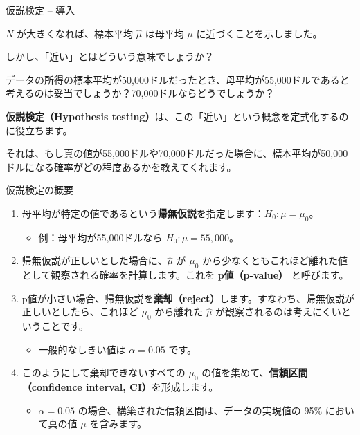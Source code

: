 \documentclass[11pt,handout]{beamer}
\newenvironment{wideitemize}{\itemize\addtolength{\itemsep}{10pt}}{\enditemize}
\begin{document}
\begin{frame}{仮説検定 -- 導入}
\begin{wideitemize}

\item
$N$ が大きくなれば、標本平均 $\hat\mu$ は母平均 $\mu$ に近づくことを示しました。

\item
しかし、「近い」とはどういう意味でしょうか？

\item
データの所得の標本平均が50,000ドルだったとき、母平均が55,000ドルであると考えるのは妥当でしょうか？70,000ドルならどうでしょうか？

\pause
\item
\textbf{仮説検定（Hypothesis testing）}は、この「近い」という概念を定式化するのに役立ちます。

\pause
\item
それは、もし真の値が55,000ドルや70,000ドルだった場合に、標本平均が50,000ドルになる確率がどの程度あるかを教えてくれます。

\end{wideitemize}
\end{frame}

\begin{frame}{仮説検定の概要}

\begin{enumerate}
	\item 
	母平均が特定の値であるという\textbf{帰無仮説}を指定します：$H_0: \mu = \mu_0$。
\smallskip
		\begin{itemize}
			\item 
			例：母平均が55,000ドルなら $H_0: \mu = 55,000$。
			\end{itemize}
	
	\medskip
	\pause
	\item
	帰無仮説が正しいとした場合に、$\hat\mu$ が $\mu_0$ から少なくともこれほど離れた値として観察される確率を計算します。これを \textbf{p値（p-value）} と呼びます。
	\medskip
	\pause
	\item
	p値が小さい場合、帰無仮説を\textbf{棄却（reject）}します。すなわち、帰無仮説が正しいとしたら、これほど $\mu_0$ から離れた $\hat\mu$ が観察されるのは考えにくいということです。
\smallskip
		\begin{itemize}
		\pause 
		\item
		一般的なしきい値は $\alpha=0.05$ です。
	\end{itemize}
	
	\vspace{.1cm}
	\pause
	\item
	このようにして棄却できないすべての $\mu_0$ の値を集めて、\textbf{信頼区間（confidence interval, CI）}を形成します。
		\begin{itemize}
			\pause
			\item
			$\alpha = 0.05$ の場合、構築された信頼区間は、データの実現値の 95\% において真の値 $\mu$ を含みます。
		\end{itemize}
\end{enumerate}
	
\end{frame}
\end{document}
